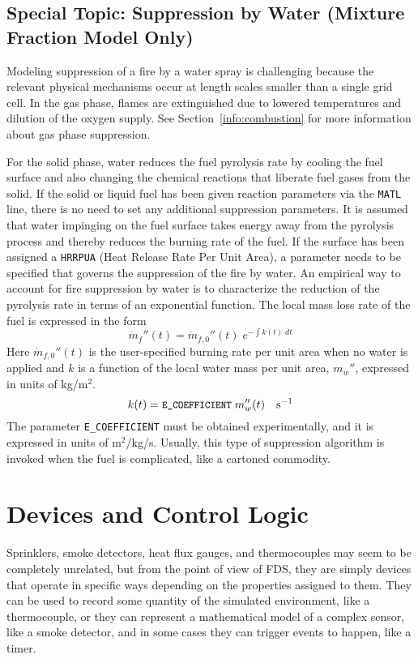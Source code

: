 \documentclass[11pt]{book}
\newcommand{\ct}{\tt\small}
\newcommand{\dm}{\dot{m}}
\newcommand{\be}{\begin{equation}}
\newcommand{\ee}{\end{equation}}
\begin{document}
\section{Special Topic: Suppression by Water (Mixture Fraction Model Only)}
Modeling suppression of a fire by a water spray is challenging because
the relevant physical mechanisms occur at length scales smaller than a
single grid cell. In the gas phase, flames are extinguished due to lowered
temperatures and dilution of the oxygen supply. See Section~\ref{info:combustion}
for more information about gas phase suppression.

For the solid phase,
water reduces the fuel pyrolysis rate by cooling the fuel surface and also
changing the chemical reactions that liberate fuel gases from the solid.
If the solid or liquid fuel has been given reaction parameters via the {\ct MATL} line, there is no
need to set any additional suppression parameters. It is assumed that
water impinging on the fuel surface takes energy away from the
pyrolysis process and thereby reduces the burning rate of the fuel.
If the surface has been assigned a {\ct HRRPUA} (Heat Release Rate Per Unit Area),
a parameter needs to be specified that governs the suppression of the fire by water.
An empirical way to account for fire suppression by water
is to characterize the reduction of the pyrolysis rate in terms
of an exponential function. The local mass loss rate of the
fuel is expressed in the form
\be \dm_f''(t) = \dm_{f,0}''(t) \; e^{-\int k(t) \; dt} \label{nistexting} \ee
Here $\dm_{f,0}''(t)$ is the user-specified burning rate per unit
area when no water is applied and $k$ is a function of the local water
mass per unit area, $m_w''$, expressed in units of kg/m$^2$.
\be
k(t) = \hbox{\ct E\_COEFFICIENT} \; m_w''(t) \quad          \hbox{s}^{-1}
\ee
The parameter {\ct E\_COEFFICIENT} must be obtained experimentally, and
it is expressed in units of m$^2$/kg/s. Usually, this type of suppression
algorithm is invoked when the fuel is complicated, like a cartoned commodity.



\clearpage

\chapter{Devices and Control Logic}

Sprinklers, smoke detectors, heat flux gauges, and thermocouples
may seem to be completely unrelated, but from the point of view
of FDS, they are simply devices that operate in specific ways depending
on the properties assigned to them. They can be used to record some
quantity of the simulated environment, like a thermocouple, or they can represent a mathematical model
of a complex sensor, like a smoke detector,
and in some cases they can trigger events to happen, like a timer.
\end{document}
